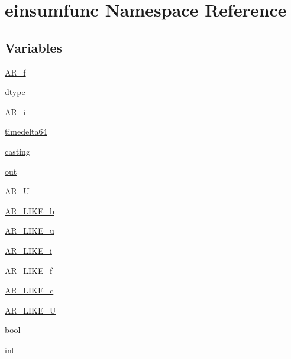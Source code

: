 \hypertarget{namespaceeinsumfunc}{}\section{einsumfunc Namespace Reference}
\label{namespaceeinsumfunc}
\subsection*{Variables}
\begin{DoxyCompactItemize}
\item 
\hyperlink{namespaceeinsumfunc_a0809b188358e8928748405dc2d087f5f}{A\+R\+\_\+f}
\item 
\hyperlink{namespaceeinsumfunc_adf429a188b44ef9b0e867bcea236aea0}{dtype}
\item 
\hyperlink{namespaceeinsumfunc_a9faa637a7d7632fa96ebc522a7cca993}{A\+R\+\_\+i}
\item 
\hyperlink{namespaceeinsumfunc_aee724132cf08bf124b43b90c9c5677e6}{timedelta64}
\item 
\hyperlink{namespaceeinsumfunc_a11c0cc02085b92ce9dd3b88c77982421}{casting}
\item 
\hyperlink{namespaceeinsumfunc_a944a87548d05c13c63b0adbc60f5c7a2}{out}
\item 
\hyperlink{namespaceeinsumfunc_aab3dfb063fefcfd31e55999355805b1f}{A\+R\+\_\+U}
\item 
\hyperlink{namespaceeinsumfunc_ae81aae7a35573c2bc6385c2d0907dad4}{A\+R\+\_\+\+L\+I\+K\+E\+\_\+b}
\item 
\hyperlink{namespaceeinsumfunc_afb1095855f1ecc08e053875ab5073fef}{A\+R\+\_\+\+L\+I\+K\+E\+\_\+u}
\item 
\hyperlink{namespaceeinsumfunc_a2810059fb56ddc34c1f705144ec12dd8}{A\+R\+\_\+\+L\+I\+K\+E\+\_\+i}
\item 
\hyperlink{namespaceeinsumfunc_a8087128d3e5d4a6f11a5a05a52b9e351}{A\+R\+\_\+\+L\+I\+K\+E\+\_\+f}
\item 
\hyperlink{namespaceeinsumfunc_a6441fb8b28698dd7c357da9f7c5f766c}{A\+R\+\_\+\+L\+I\+K\+E\+\_\+c}
\item 
\hyperlink{namespaceeinsumfunc_ac66550c790ee162017239e0f86842ed8}{A\+R\+\_\+\+L\+I\+K\+E\+\_\+U}
\item 
\hyperlink{namespaceeinsumfunc_a7a9dadc71a62036a54f6429bc09561b7}{bool}
\item 
\hyperlink{namespaceeinsumfunc_abca69d67e43bb6c0b6417aae551c75bd}{int}
\end{DoxyCompactItemize}


